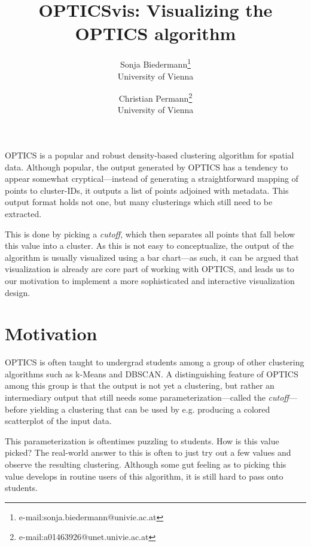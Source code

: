 \documentclass{vgtc}                          %
\title{OPTICSvis: Visualizing the OPTICS algorithm}
\author{Sonja Biedermann\thanks{e-mail:sonja.biedermann@univie.ac.at }\\ %
        \scriptsize University of Vienna %
\and Christian Permann\thanks{e-mail:a01463926@unet.univie.ac.at}\\ %
     \scriptsize  University of Vienna}
\begin{document}


\maketitle


OPTICS is a popular and robust density-based clustering algorithm for spatial
data. Although popular, the output generated by OPTICS has a tendency to appear
somewhat cryptical---instead of generating a straightforward mapping of points
to cluster-IDs, it outputs a list of points adjoined with metadata. This output
format holds not one, but many clusterings which still need to be extracted.

This is done by picking a \emph{cutoff}, which then separates all points that
fall below this value into a cluster. As this is not easy to conceptualize, the
output of the algorithm is usually visualized using a bar chart---as such, it
can be argued that visualization is already are core part of working with
OPTICS, and leads us to our motivation to implement a more sophisticated and
interactive visualization design.

\section{Motivation} %

OPTICS is often taught to undergrad students among a group of other clustering
algorithms such as k-Means and DBSCAN. A distinguishing feature of OPTICS among
this group is that the output is not yet a clustering, but rather an
intermediary output that still needs some parameterization---called the
\emph{cutoff}---before yielding a clustering that can be used by e.g. producing
a colored scatterplot of the input data.

This parameterization is oftentimes puzzling to students. How is this value
picked? The real-world answer to this is often to just try out a few values and
observe the resulting clustering. Although some gut feeling as to picking this
value develops in routine users of this algorithm, it is still hard to pass
onto students.
\end{document}
